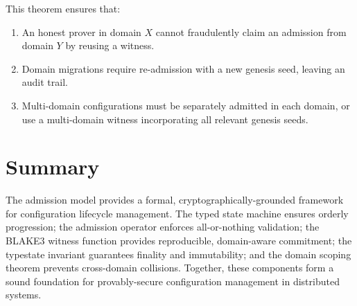\documentclass[11pt]{article}
\begin{document}
This theorem ensures that:
\begin{enumerate}
  \item An honest prover in domain $X$ cannot fraudulently claim an admission from domain $Y$ by reusing a witness.
  \item Domain migrations require re-admission with a new genesis seed, leaving an audit trail.
  \item Multi-domain configurations must be separately admitted in each domain, or use a multi-domain witness incorporating all relevant genesis seeds.
\end{enumerate}

\section*{Summary}

The admission model provides a formal, cryptographically-grounded framework for configuration lifecycle management. The typed state machine ensures orderly progression; the admission operator enforces all-or-nothing validation; the BLAKE3 witness function provides reproducible, domain-aware commitment; the typestate invariant guarantees finality and immutability; and the domain scoping theorem prevents cross-domain collisions. Together, these components form a sound foundation for provably-secure configuration management in distributed systems.
\end{document}
